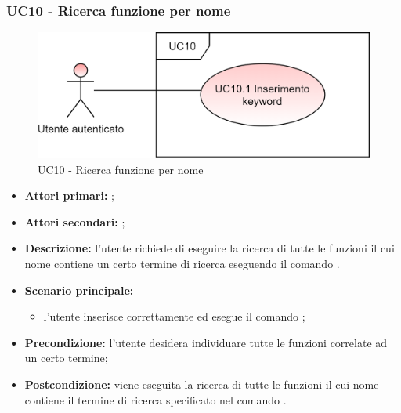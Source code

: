 \subsubsection{UC10 - Ricerca funzione per nome}
\begin{figure}[H]
	\centering
	\includegraphics[scale=\ucs]{./res/img/UC10.png}
	\caption {UC10 - Ricerca funzione per nome}
\end{figure}
\begin{itemize}
	\item \textbf{Attori primari:} \ua{};
	\item \textbf{Attori secondari:} \re{};
	\item \textbf{Descrizione:} l’utente richiede di eseguire la ricerca di tutte le funzioni il cui nome contiene un certo termine di ricerca eseguendo il comando \psearch{}.
	\item \textbf{Scenario principale:} 
	\begin{itemize}
		\item l’utente inserisce correttamente ed esegue il comando \psearch{};
	\end{itemize}
	\item \textbf{Precondizione:} l’utente desidera individuare tutte le funzioni correlate ad un certo termine;
	\item \textbf{Postcondizione:} viene eseguita la ricerca di tutte le funzioni il cui nome contiene il termine di ricerca specificato nel comando \search{}.
\end{itemize}
